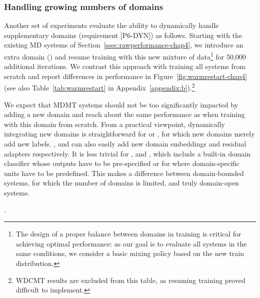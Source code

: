 \subsubsection{Handling growing numbers of domains}
\label{ssec:continual-chap4}
Another set of experiments evaluate the ability to dynamically handle supplementary domains (requirement [P6-DYN]) as follows. Starting with the existing MD systems of Section~\ref{ssec:rawperformance-chap4}, we introduce an extra domain () and resume training with this new mixture of data\footnote{The design of a proper balance between domains in training is critical for achieving optimal performance: as our goal is to evaluate all systems in the same conditions, we consider a basic mixing policy based on the new train distribution.} for 50,000 additional iterations. We contrast this approach with training all systems from scratch and report differences in performance in Figure~\ref{fig:warmrestart-chap4} (see also Table~\ref{tab:warmrestart} in Appendix~\ref{appendix:b}).\footnote{WDCMT results are excluded from this table, as resuming training proved difficult to implement.}

We expect that MDMT systems should not be too significantly impacted by adding a new domain and reach about the same performance as when training with this domain from scratch. From a practical viewpoint, dynamically integrating new domains is straightforward for  or , for which new domains merely add new labels. ,  and  can also easily add new domain embeddings and residual adapters respectively. It is less trivial for ,  and , which include a built-in domain classifier whose outputs have to be pre-specified or for  where domain-specific units have to be predefined. This makes a difference between domain-bounded systems, for which the number of domains is limited, and truly domain-open systems.

\begin{figure*}[h!]
    \begin{center}
        
    \end{center}
    \caption[Ability to handle a new domain]{Ability to handle a new domain. We report BLEU scores for a complete training session with 7 domains, as well as differences (in blue) with training with 6 domains (from Table~\ref{tab:performance-chap4}); and (in red) differences with continual training}.
    \label{fig:warmrestart-chap4}
\end{figure*}

